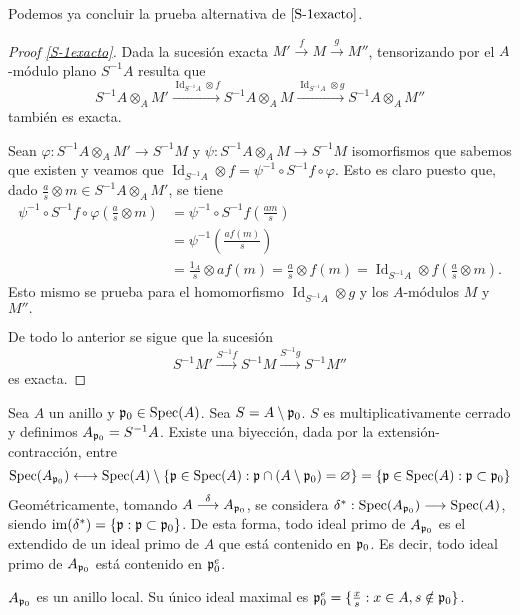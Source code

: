 \documentclass[../main.tex]{subfiles}
\begin{document}
	Podemos ya concluir la prueba alternativa de $\ref{S-1exacto}$.
	\begin{proof}[Proof \ref{S-1exacto}]
		Dada la sucesión exacta $M'\overset{f}{\longrightarrow}M\overset{g}{\longrightarrow}M''$, tensorizando por el $A$-módulo plano $S^{-1}A$ resulta que
		$$S^{-1}A\otimes_AM'\overset{\operatorname{Id}_{S^{-1}A}\otimes f}{\longrightarrow}S^{-1}A\otimes_AM\overset{\operatorname{Id}_{S^{-1}A}\otimes g}{\longrightarrow}S^{-1}A\otimes_AM''$$
		también es exacta.

		Sean $\varphi:S^{-1}A\otimes_AM'\longrightarrow S^{-1}M$ y $\psi:S^{-1}A\otimes_AM\longrightarrow S^{-1}M$ isomorfismos que sabemos que existen y veamos que $\operatorname{Id}_{S^{-1}A}\otimes f=\psi^{-1}\circ S^{-1}f\circ \varphi.$ Esto es claro puesto que, dado $\frac{a}{s}\otimes m\in S^{-1}A\otimes_A M'$, se tiene
		\begin{align*}
		\psi^{-1}\circ S^{-1}f\circ \varphi\left(\frac{a}{s}\otimes m\right)&=\psi^{-1}\circ S^{-1}f\left(\frac{am}{s}\right)\\
		&=\psi^{-1}\left(\frac{af(m)}{s}\right)\\
		&=\frac{1_A}{s}\otimes af(m)=\frac{a}{s}\otimes f(m)=\operatorname{Id}_{S^{-1}A}\otimes f\left(\frac{a}{s}\otimes m\right).
		\end{align*}
		Esto mismo se prueba para el homomorfismo $\operatorname{Id}_{S^{-1}A}\otimes g$ y los $A$-módulos $M$ y $M''.$

		De todo lo anterior se sigue que la sucesión
		$$S^{-1}M'\overset{S^{-1}f}{\longrightarrow}S^{-1}M\overset{S^{-1}g}{\longrightarrow}S^{-1}M''$$
		es exacta.
	\end{proof}
	\begin{example}
Sea $A$ un anillo y $\mathfrak{p}_0\in \operatorname{Spec}(A)$. Sea $S=A\setminus\mathfrak{p}_0$. $S$ es multiplicativamente cerrado y definimos $A_{\mathfrak{p}_0}=S^{-1}A$. Existe una biyección, dada por la extensión-contracción, entre $$\operatorname{Spec}(A_{\mathfrak{p}_0})\longleftrightarrow \operatorname{Spec}(A)\setminus\{\mathfrak{p}\in \operatorname{Spec}(A):\mathfrak{p}\cap(A\setminus\mathfrak{p}_0)=\varnothing\}=\{\mathfrak{p}\in \operatorname{Spec}(A):\mathfrak{p}\subset\mathfrak{p}_0\}$$
Geométricamente, tomando $A\overset{\delta}{\longrightarrow}A_{\mathfrak{p}_0}$, se considera $\delta^{\ast}:\operatorname{Spec}(A_{\mathfrak{p}_0})\longrightarrow \operatorname{Spec}(A)$, siendo $\operatorname{im}(\delta^{\ast})=\{\mathfrak{p}:\mathfrak{p}\subset \mathfrak{p}_0\}$. De esta forma, todo ideal primo de $A_{\mathfrak{p}_0}$ es el extendido de un ideal primo de $A$ que está contenido en $\mathfrak{p}_0$. Es decir, todo ideal primo de $A_{\mathfrak{p}_0}$ está contenido en $\mathfrak{p}_0^e$.

$A_{\mathfrak{p}_0}$ es un anillo local. Su único ideal maximal es $\mathfrak{p}_0^e=\{\frac{x}{s}:x\in A, s\notin\mathfrak{p}_0\}$.
\end{example}
\end{document}
